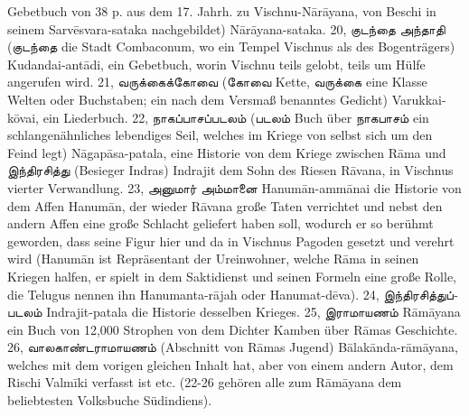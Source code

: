 \documentclass{article}
\newcommand{\TamilText}[1]{\texttamil{#1}}
\newcommand{\tam}[1]{\TamilText{#1}}
\begin{document}
Gebetbuch von 38 p. aus dem 17. Jahrh. zu Vischnu-N\={a}r\={a}yana, von Beschi in seinem Sarv\={e}svara-sataka nachgebildet) N\={a}r\={a}yana-sataka. 20, \tam{குடந்தை} \tam{அந்தாதி} (\tam{குடந்தை} die Stadt Combaconum, wo ein Tempel Vischnus als des Bogenträgers) Kudandai-ant\={a}di, ein Gebetbuch, worin Vischnu teils gelobt, teils um Hülfe angerufen wird. 21, \tam{வருக்கைக்கோவை} (\tam{கோவை} Kette, \tam{வருக்கை} eine Klasse Welten oder Buchstaben; ein nach dem Versmaß benanntes Gedicht) Varukkai-k\={o}vai, ein Liederbuch. 22, \tam{நாகப்பாசப்படலம்} (\tam{படலம்} Buch über \tam{நாகபாசம்} ein schlangenähnliches lebendiges Seil, welches im Kriege von selbst sich um den Feind legt) N\={a}gap\={a}sa-patala, eine Historie von dem Kriege zwischen R\={a}ma und \tam{இந்திரசித்து} (Besieger Indras) Indrajit dem Sohn des Riesen R\={a}vana, in Vischnus vierter Verwandlung. 23, \tam{அனுமார்} \tam{அம்மானை} Hanum\={a}n-amm\={a}nai die Historie von dem Affen Hanum\={a}n, der wieder R\={a}vana große Taten verrichtet und nebst den andern Affen eine große Schlacht geliefert haben soll, wodurch er so berühmt geworden, dass seine Figur hier und da in Vischnus Pagoden gesetzt und verehrt wird (Hanum\={a}n ist Repräsentant der Ureinwohner, welche R\={a}ma in seinen Kriegen halfen, er spielt in dem Saktidienst und seinen Formeln eine große Rolle, die Telugus nennen ihn Hanumanta-r\={a}jah oder Hanumat-d\={e}va). 24, \tam{இந்திரசித்துப்படலம்} Indrajit-patala die Historie desselben Krieges. 25, \tam{இராமாயணம்} R\={a}m\={a}yana ein Buch von 12,000 Strophen von dem Dichter Kamben über R\={a}mas Geschichte. 26, \tam{வாலகாண்டராமாயணம்} (Abschnitt von R\={a}mas Jugend) B\={a}lak\={a}nda-r\={a}m\={a}yana, welches mit dem vorigen gleichen Inhalt hat, aber von einem andern Autor, dem Rischi Valm\={i}ki verfasst ist etc. (22-26 gehören alle zum R\={a}m\={a}yana dem beliebtesten Volksbuche Südindiens).
\end{document}
